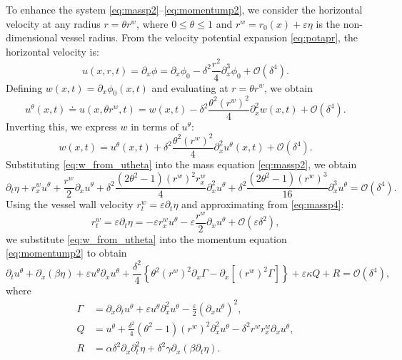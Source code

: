\documentclass[alpha-refs, 12pt]{wiley-article}
\renewcommand{\O}{\mathcal{O}}
\renewcommand{\leq}{\leqslant}
\newcommand{\eps}{\varepsilon}
\begin{document}
To enhance the system \eqref{eq:massp2}--\eqref{eq:momentump2}, we consider the horizontal velocity at any radius $r = \theta r^w$, where $0 \leq \theta \leq 1$ and $r^w = r_0(x) + \eps \eta$ is the non-dimensional vessel radius. From the velocity potential expansion \eqref{eq:potapr}, the horizontal velocity is:
\[
  u(x, r, t) = \partial_x \phi = \partial_x \phi_0 - \delta^2 \frac{r^2}{4} \partial_x^3 \phi_0 + \O(\delta^4).
\]
Defining $w(x, t) = \partial_x \phi_0(x, t)$ and evaluating at $r = \theta r^w$, we obtain
\begin{equation}\label{eq:generalu}
  u^\theta(x, t) \doteq u(x, \theta r^w, t) = w(x, t) - \delta^2 \frac{\theta^2 (r^w)^2}{4} \partial_x^2 w(x, t) + \O(\delta^4).
\end{equation}
Inverting this, we express $w$ in terms of $u^\theta$:
\begin{equation}\label{eq:w_from_utheta}
  w(x, t) = u^\theta(x, t) + \delta^2 \frac{\theta^2 (r^w)^2}{4} \partial_x^2 u^\theta(x, t) + \O(\delta^4).
\end{equation}
Substituting \eqref{eq:w_from_utheta} into the mass equation \eqref{eq:massp2}, we obtain
\begin{equation}\label{eq:massp4}
  \partial_t \eta + r^w_x u^\theta + \frac{r^w}{2} \partial_x u^\theta + \delta^2 \frac{(2 \theta^2 - 1) (r^w)^2 r^w_x}{4} \partial_x^2 u^\theta + \delta^2 \frac{(2 \theta^2 - 1) (r^w)^3}{16} \partial_x^3 u^\theta = \O(\delta^4).
\end{equation}
Using the vessel wall velocity $r^w_t = \eps \partial_t \eta$ and approximating from \eqref{eq:massp4}:
\begin{equation}\label{eq:rw_t}
  r^w_t = \eps \partial_t \eta = -\eps r^w_x u^\theta - \eps \frac{r^w}{2} \partial_x u^\theta + \O(\eps \delta^2),
\end{equation}
we substitute \eqref{eq:w_from_utheta} into the momentum equation \eqref{eq:momentump2} to obtain
\begin{equation}\label{eq:momentump4}
  \partial_t u^\theta + \partial_x (\beta \eta) + \eps u^\theta \partial_x u^\theta + \frac{\delta^2}{4} \left\{ \theta^2 (r^w)^2 \partial_x \Gamma - \partial_x [(r^w)^2 \Gamma] \right\} + \eps \kappa Q + R = \O(\delta^4),
\end{equation}
where
\begin{equation}\label{eq:gamman}
\begin{aligned}
  \Gamma &= \partial_x \partial_t u^\theta + \eps u^\theta \partial_x^2 u^\theta - \frac{\eps}{2} (\partial_x u^\theta)^2, \\
  Q &= u^\theta + \frac{\delta^2}{4} (\theta^2 - 1) (r^w)^2 \partial_x^2 u^\theta - \delta^2 r^w r^w_x \partial_x u^\theta, \\
  R &= \alpha \delta^2 \partial_x \partial_t^2 \eta + \delta^2 \gamma \partial_x (\beta \partial_t \eta).
\end{aligned}
\end{equation}
\end{document}
